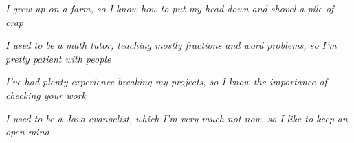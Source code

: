 



\medskip



\textit{I grew up on a farm, so I know how to put my head down and shovel a pile of crap}

\divider

\textit{I used to be a math tutor, teaching mostly fractions and word problems, so I'm pretty patient with people}

\divider

\textit{I've had plenty experience breaking my projects, so I know the importance of checking your work}

\divider

\textit{I used to be a Java evangelist, which I'm very much not now, so I like to keep an open mind}
